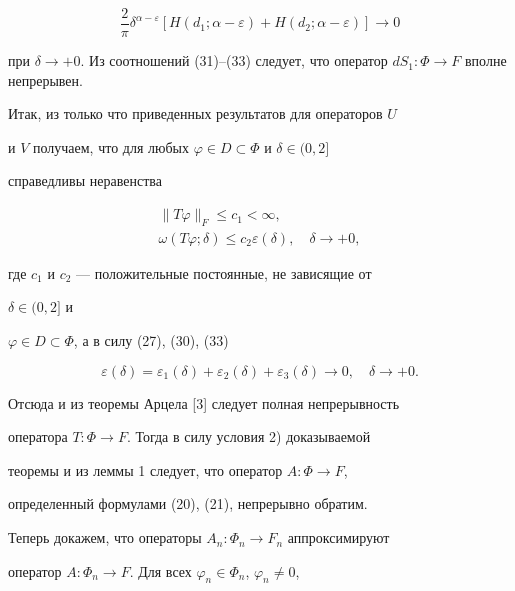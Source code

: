 \begin{pf}
\begin{equation}
\frac{2}{\pi}\delta^{\alpha-\varepsilon}[H(d_1; 


\alpha-\varepsilon)+H(d_2;\alpha-\varepsilon)]\to0 


\end{equation} 


при $\delta\to+0$. Из соотношений (31)--(33) следует, что оператор $d 


S_1:\Phi\to F$ вполне непрерывен. 


 


Итак, из только что приведенных результатов для операторов $U$ 


и $V$ получаем, что для любых $\varphi\in D\subset\Phi$ и $\delta\in(0,2]$ 


справедливы неравенства 


\begin{gather} 


\|T\varphi\|_F\le c_1<\infty, \\ 


% 


\omega(T\varphi;\delta)\le c_2\varepsilon(\delta),\quad 


\delta\to+0, 


\end{gather} 


где $c_1$ и $c_2$ --- положительные постоянные, не зависящие от 


$\delta\in(0,2]$ и 


$\varphi\in D\subset\Phi$, а в силу (27), (30), (33) 


$$ 


\varepsilon(\delta)=\varepsilon_1(\delta)+ 


\varepsilon_2(\delta)+\varepsilon_3(\delta)\to0,\quad 


\delta\to+0. 


$$ 


Отсюда и из теоремы Арцела [3] следует полная непрерывность 


оператора $T:\Phi\to F$. Тогда в силу условия 2) доказываемой 


теоремы и из леммы 1 следует, что оператор $A:\Phi\to F$, 


определенный формулами (20), (21), непрерывно обратим. 


 


Теперь докажем, что операторы $A_n:\Phi_n\to F_n$ аппроксимируют 


оператор $A:\Phi_n\to F$. Для всех $\varphi_n\in\Phi_n$, $\varphi_n\ne0$, 



\end{pf}
